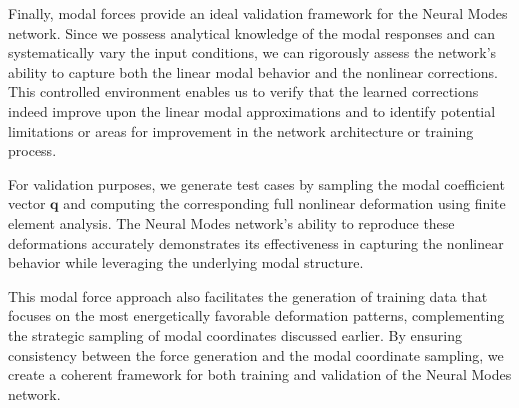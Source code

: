Finally, modal forces provide an ideal validation framework for the Neural Modes network. Since we possess analytical knowledge of the modal responses and can systematically vary the input conditions, we can rigorously assess the network's ability to capture both the linear modal behavior and the nonlinear corrections. This controlled environment enables us to verify that the learned corrections indeed improve upon the linear modal approximations and to identify potential limitations or areas for improvement in the network architecture or training process.

For validation purposes, we generate test cases by sampling the modal coefficient vector $\bm{q}$ and computing the corresponding full nonlinear deformation using finite element analysis. The Neural Modes network's ability to reproduce these deformations accurately demonstrates its effectiveness in capturing the nonlinear behavior while leveraging the underlying modal structure.

This modal force approach also facilitates the generation of training data that focuses on the most energetically favorable deformation patterns, complementing the strategic sampling of modal coordinates discussed earlier. By ensuring consistency between the force generation and the modal coordinate sampling, we create a coherent framework for both training and validation of the Neural Modes network.

